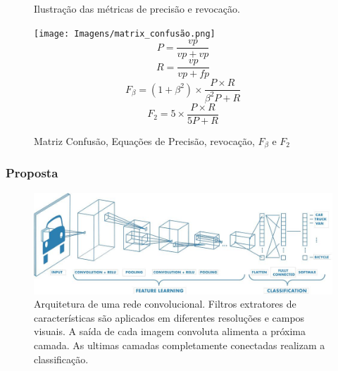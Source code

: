 \documentclass{beamer}
\begin{document}
\begin{frame}
\begin{figure}[!ht]
\begin{minipage}[c]{0.4\textwidth}
                \caption{Ilustração das métricas de precisão e revocação.}
            \end{minipage}%
            \begin{minipage}{0.5\textwidth}
                \texttt{[image: Imagens/matrix\_confusão.png]}
                \begin{equation} P = \frac{vp}{vp + vp} \end{equation}
                \begin{equation}R = \frac{vp}{vp + fp}\end{equation}
                \begin{equation}F_\beta = (1+\beta^2) \times \frac {P \times R}{\beta^2 P + R}\end{equation}
                \begin{equation}F_2 = 5 \times \frac {P \times R}{5 P + R}\end{equation}    
            \end{minipage}
            \caption{Matriz Confusão, Equações de Precisão, revocação, $F_\beta$ e $F_2$}         
            \label{fig:metricas}
        \end{figure}
\end{frame}  


\begin{frame}
    \frametitle{Proposta}
        \begin{figure}[!ht]
            \centering
            \includegraphics[width=0.95\columnwidth]{
                Imagens/CNN_mathworks.jpg
            }
            \caption{Arquitetura de uma rede convolucional. Filtros extratores de características são aplicados em diferentes resoluções e campos visuais. A saída de cada imagem convoluta alimenta a próxima camada. As ultimas camadas completamente conectadas realizam a classificação.}
            \label{fig:cnn}
        \end{figure}
    \end{frame}
\end{document}

